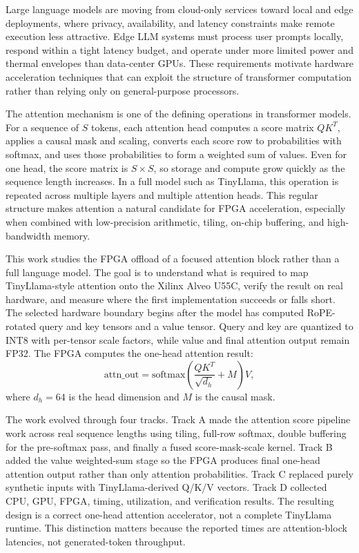\documentclass[conference]{IMSTemplate}
\begin{document}
Large language models are moving from cloud-only services toward local and edge
deployments, where privacy, availability, and latency constraints make remote
execution less attractive. Edge LLM systems must process user prompts locally,
respond within a tight latency budget, and operate under more limited power and
thermal envelopes than data-center GPUs. These requirements motivate hardware
acceleration techniques that can exploit the structure of transformer
computation rather than relying only on general-purpose processors.

The attention mechanism is one of the defining operations in transformer
models. For a sequence of \(S\) tokens, each attention head computes a score
matrix \(QK^T\), applies a causal mask and scaling, converts each score row to
probabilities with softmax, and uses those probabilities to form a weighted sum
of values. Even for one head, the score matrix is \(S \times S\), so storage
and compute grow quickly as the sequence length increases. In a full model such
as TinyLlama, this operation is repeated across multiple layers and multiple
attention heads. This regular structure makes attention a natural candidate for
FPGA acceleration, especially when combined with low-precision arithmetic,
tiling, on-chip buffering, and high-bandwidth memory.

This work studies the FPGA offload of a focused attention block rather than
a full language model. The goal is to understand what is required to map
TinyLlama-style attention onto the Xilinx Alveo U55C, verify the result on real
hardware, and measure where the first implementation succeeds or falls short.
The selected hardware boundary begins after the model has computed
RoPE-rotated query and key tensors and a value tensor. Query and key are
quantized to INT8 with per-tensor scale factors, while value and final
attention output remain FP32. The FPGA computes the one-head attention result:
\[
    \mathrm{attn\_out} =
    \mathrm{softmax}\left(\frac{QK^T}{\sqrt{d_h}} + M\right)V,
\]
where \(d_h=64\) is the head dimension and \(M\) is the causal mask.

The work evolved through four tracks. Track A made the attention
score pipeline work across real sequence lengths using tiling, full-row
softmax, double buffering for the pre-softmax pass, and finally a fused
score-mask-scale kernel. Track B added the value weighted-sum stage so the FPGA
produces final one-head attention output rather than only attention
probabilities. Track C replaced purely synthetic inputs with TinyLlama-derived
Q/K/V vectors. Track D collected CPU, GPU, FPGA, timing, utilization, and
verification results. The resulting design is a correct one-head attention
accelerator, not a complete TinyLlama runtime. This distinction matters because
the reported times are attention-block latencies, not generated-token
throughput.
\end{document}
